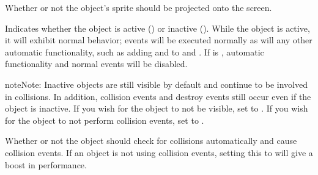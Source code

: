 \documentclass[letterpaper,10pt,english]{sphinxmanual}
\begin{document}
\begin{fulllineitems}
\begin{fulllineitems}
\end{fulllineitems}


\begin{fulllineitems}
\label{dsp:sge.dsp.Object.visible}
Whether or not the object's sprite should be projected onto the
screen.

\end{fulllineitems}


\begin{fulllineitems}
\label{dsp:sge.dsp.Object.active}
Indicates whether the object is active () or
inactive ().  While the object is active, it will
exhibit normal behavior; events will be executed normally as will
any other automatic functionality, such as adding
{\hyperref[dsp:sge.dsp.Object.xvelocity]{\emph{}}} and {\hyperref[dsp:sge.dsp.Object.yvelocity]{\emph{}}}
to {\hyperref[dsp:sge.dsp.Object.x]{\emph{}}} and {\hyperref[dsp:sge.dsp.Object.y]{\emph{}}}.  If {\hyperref[dsp:sge.dsp.Object.active]{\emph{}}} is ,
automatic functionality and normal events will be disabled.

\begin{notice}{note}{Note:}
Inactive {\hyperref[dsp:sge.dsp.Object]{\emph{}}} objects are still visible
by default and continue to be involved in collisions.  In
addition, collision events and destroy events still occur even
if the object is inactive.  If you wish for the object to not
be visible, set {\hyperref[dsp:sge.dsp.Object.visible]{\emph{}}} to .  If you
wish for the object to not perform collision events, set
{\hyperref[dsp:sge.dsp.Object.tangible]{\emph{}}} to .
\end{notice}

\end{fulllineitems}


\begin{fulllineitems}
\label{dsp:sge.dsp.Object.checks_collisions}
Whether or not the object should check for collisions
automatically and cause collision events.  If an object is not
using collision events, setting this to  will give
a boost in performance.


\end{fulllineitems}
\end{fulllineitems}
\end{document}
